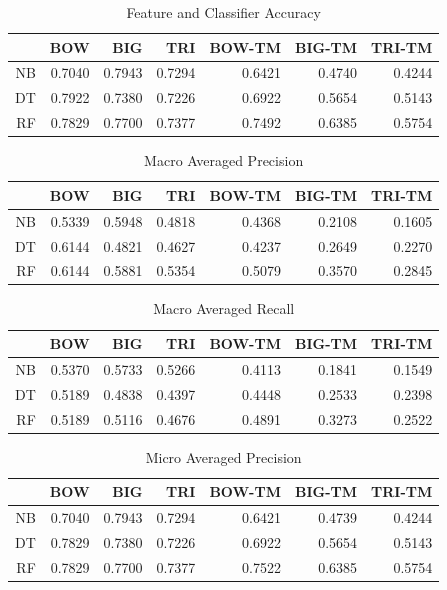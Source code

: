 \documentclass[11pt]{article}
\begin{document}
\begin{table}[htbp]
  \centering
  \caption{Feature and Classifier Accuracy}
    \begin{tabular}{rrrrrrr}
    \toprule
          & BOW   & BIG   & TRI   & BOW-TM & BIG-TM & TRI-TM \\
    \midrule
    NB    & 0.7040 & 0.7943 & 0.7294 & 0.6421 & 0.4740 & 0.4244 \\
    DT    & 0.7922 & 0.7380 & 0.7226 & 0.6922 & 0.5654 & 0.5143 \\
    RF    & 0.7829 & 0.7700 & 0.7377 & 0.7492 & 0.6385 & 0.5754 \\
    \bottomrule
    \end{tabular}%
  \label{tab:acc}%
\end{table}%

\begin{table}[htbp]
  \centering
  \caption{Macro Averaged Precision}
    \begin{tabular}{rrrrrrr}
    \toprule
          & BOW   & BIG   & TRI   & BOW-TM & BIG-TM & TRI-TM \\
    \midrule
    NB    & 0.5339 & 0.5948 & 0.4818 & 0.4368 & 0.2108 & 0.1605 \\
    DT    & 0.6144 & 0.4821 & 0.4627 & 0.4237 & 0.2649 & 0.2270 \\
    RF    & 0.6144 & 0.5881 & 0.5354 & 0.5079 & 0.3570 & 0.2845 \\
    \bottomrule
    \end{tabular}%
  \label{tab:map}%
\end{table}%

\begin{table}[htbp]
  \centering
  \caption{Macro Averaged Recall}
    \begin{tabular}{rrrrrrr}
    \toprule
          & BOW   & BIG   & TRI   & BOW-TM & BIG-TM & TRI-TM \\
    \midrule
    NB    & 0.5370 & 0.5733 & 0.5266 & 0.4113 & 0.1841 & 0.1549 \\
    DT    & 0.5189 & 0.4838 & 0.4397 & 0.4448 & 0.2533 & 0.2398 \\
    RF    & 0.5189 & 0.5116 & 0.4676 & 0.4891 & 0.3273 & 0.2522 \\
    \bottomrule
    \end{tabular}%
  \label{tab:mar}%
\end{table}%

\begin{table}[htbp]
  \centering
  \caption{Micro Averaged Precision}
    \begin{tabular}{rrrrrrr}
    \toprule
          & BOW   & BIG   & TRI   & BOW-TM & BIG-TM & TRI-TM \\
    \midrule
    NB    & 0.7040 & 0.7943 & 0.7294 & 0.6421 & 0.4739 & 0.4244 \\
    DT    & 0.7829 & 0.7380 & 0.7226 & 0.6922 & 0.5654 & 0.5143 \\
    RF    & 0.7829 & 0.7700 & 0.7377 & 0.7522 & 0.6385 & 0.5754 \\
    \bottomrule
    \end{tabular}%
  \label{tab:mip}%
\end{table}%
\end{document}

